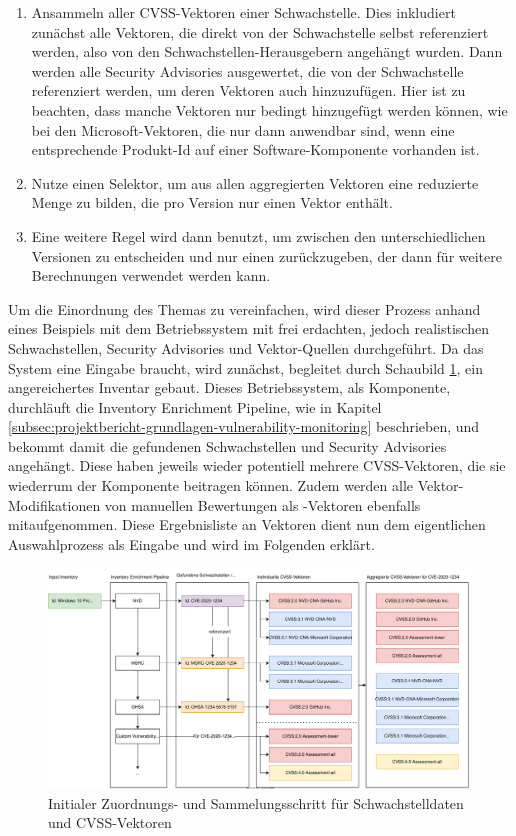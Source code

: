 \begin{enumerate}
    \item Ansammeln aller CVSS-Vektoren einer Schwachstelle.
    Dies inkludiert zunächst alle Vektoren, die direkt von der Schwachstelle selbst referenziert werden, also von den Schwachstellen-Herausgebern angehängt wurden.
    Dann werden alle Security Advisories ausgewertet, die von der Schwachstelle referenziert werden, um deren Vektoren auch hinzuzufügen.
    Hier ist zu beachten, dass manche Vektoren nur bedingt hinzugefügt werden können, wie bei den Microsoft-Vektoren, die nur dann anwendbar sind, wenn eine entsprechende Produkt-Id auf einer Software-Komponente vorhanden ist.
    \item Nutze einen Selektor, um aus allen aggregierten Vektoren eine reduzierte Menge zu bilden, die pro Version nur einen Vektor enthält.
    \item Eine weitere Regel wird dann benutzt, um zwischen den unterschiedlichen Versionen zu entscheiden und nur einen zurückzugeben, der dann für weitere Berechnungen verwendet werden kann.
\end{enumerate}

Um die Einordnung des Themas zu vereinfachen, wird dieser Prozess anhand eines Beispiels mit dem Betriebssystem  mit frei erdachten, jedoch realistischen Schwachstellen, Security Advisories und Vektor-Quellen durchgeführt.
Da das System eine Eingabe braucht, wird zunächst, begleitet durch Schaubild \ref{fig:cvss-selection-process-collection}, ein angereichertes Inventar gebaut.
Dieses Betriebssystem, als Komponente, durchläuft die Inventory Enrichment Pipeline, wie in Kapitel \ref{subsec:projektbericht-grundlagen-vulnerability-monitoring} beschrieben, und bekommt damit die gefundenen Schwachstellen und Security Advisories angehängt.
Diese haben jeweils wieder potentiell mehrere CVSS-Vektoren, die sie wiederrum der Komponente beitragen können.
Zudem werden alle Vektor-Modifikationen von manuellen Bewertungen als -Vektoren ebenfalls mitaufgenommen.
Diese Ergebnisliste an Vektoren dient nun dem eigentlichen Auswahlprozess als Eingabe und wird im Folgenden erklärt.

\begin{figure}[htbp] %
    \centering
    \includegraphics[width=1\textwidth, keepaspectratio]{res/grafiken/cvss-selection-process-collection}
    \caption{Initialer Zuordnungs- und Sammelungsschritt für Schwachstelldaten und CVSS-Vektoren}
    \label{fig:cvss-selection-process-collection}
\end{figure}

